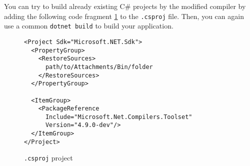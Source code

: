 You can try to build already existing C\# projects by the modified compiler by adding the following code fragment \ref{img81:usage} to the \texttt{.csproj} file. 
Then, you can again use a common \texttt{dotnet build} to build your application.
\begin{figure}[h!]
\begin{lstlisting}
<Project Sdk="Microsoft.NET.Sdk">
  <PropertyGroup>
    <RestoreSources>
      path/to/Attachments/Bin/folder
    </RestoreSources>
  </PropertyGroup>

  <ItemGroup>
    <PackageReference 
      Include="Microsoft.Net.Compilers.Toolset" 
      Version="4.9.0-dev"/>
  </ItemGroup>
</Project>
\end{lstlisting}
\caption{\texttt{.csproj} project}
\label{img81:usage}
\end{figure}